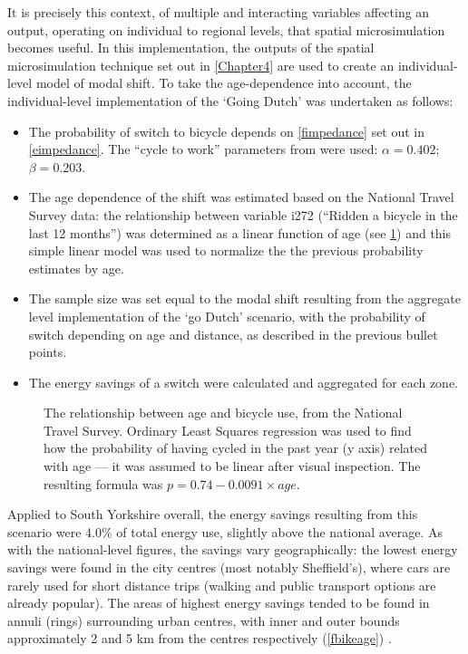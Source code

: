 It is precisely this context, of multiple and interacting variables
affecting an output, operating on individual to regional levels,
that spatial microsimulation becomes useful. In this implementation,
the outputs of the spatial microsimulation technique set out
in \cref{Chapter4} are used to create an individual-level model of modal shift.
To take the age-dependence into account, the individual-level implementation
of the `Going Dutch' was undertaken as follows:
\begin{itemize}
\item The probability of switch to bicycle depends on \cref{fimpedance}
set out in \cref{eimpedance}.
The ``cycle to work'' parameters from
\citet{Iacono2010} were used: $\alpha = 0.402$; $\beta = 0.203$.
\item The age dependence of the shift was estimated based on the National
Travel Survey data: the 
relationship between variable i272 (``Ridden a bicycle in the last 12 months'')
was determined as a linear function of age (see \cref{fpriden}) and this
simple linear model was used to normalize the the previous probability
estimates by age.
\item The sample size was set equal to the modal shift resulting from the
aggregate level implementation of the `go Dutch' scenario, with the probability
of switch depending on age and distance, as described in the previous bullet points.
\item The energy savings of a switch were calculated and aggregated for each zone.
\end{itemize}

\begin{figure}
 \caption[The relationship between age and bicycle use]
 {The relationship between age and bicycle use, from the National Travel Survey.
 Ordinary Least Squares regression was used to find how the probability
 of having cycled in the past year (y axis) related with age --- it was assumed
 to be linear after visual inspection. The resulting formula was $p = 0.74 -
 0.0091 \times age$. 
 } \label{fpriden}
\end{figure}

Applied to South Yorkshire overall, the energy savings resulting from this
scenario were 4.0\% of total energy use, slightly above the national average.
As with the national-level figures, the savings vary geographically: the lowest
energy savings were found in the city centres (most notably Sheffield's),
where cars are rarely used for short distance trips (walking and public
transport options are already popular). The areas of highest energy savings
tended to be found in annuli (rings) surrounding urban centres, with inner and
outer bounds approximately 2 and 5 km from the centres respectively (\cref{fbikeage}) .

